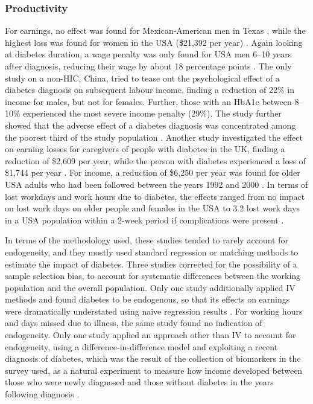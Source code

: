 \subsubsection{Productivity}
For earnings, no effect was found for Mexican-American men in Texas \parencite{Bastida2002}, while the highest loss was found for women in the USA (\$21,392 per year) \parencite{Minor2011}. Again looking at diabetes duration, a wage penalty was only found for USA men 6--10 years after diagnosis, reducing their wage by about 18 percentage points \parencite{Minor2013}. The only study on a non-\ac{HIC}, China, tried to tease out the psychological effect of a diabetes diagnosis on subsequent labour income, finding a reduction of 22\% in income for males, but not for females. Further, those with an \ac{HbA1c} between 8--10\% experienced the most severe income penalty (29\%). The study further showed that the adverse effect of a diabetes diagnosis was concentrated among the poorest third of the study population \parencite{Liu2014}. Another study investigated the effect on earning losses for caregivers of people with diabetes in the \ac{UK}, finding a reduction of \$2,609 per year, while the person with diabetes experienced a loss of \$1,744 per year \parencite{Holmes2003a}. For income, a reduction of \$6,250 per year was found for older USA adults who had been followed between the years 1992 and 2000 \parencite{Rivera2004}. In terms of lost workdays and work hours due to diabetes, the effects ranged from no impact on lost work days on older people \parencite{Rivera2004} and females in the USA \parencite{Minor2011} to 3.2 lost work days in a USA population within a 2-week period if complications were present \parencite{Ng2001b}.

In terms of the methodology used, these studies tended to rarely account for endogeneity, and they mostly used standard regression or matching methods to estimate the impact of diabetes. Three studies \parencite{Minor2011,Bastida2002,BrownIII2011} corrected for the possibility of a sample selection bias, to account for systematic differences between the working population and the overall population. Only one study additionally applied \ac{IV} methods and found diabetes to be endogenous, so that its effects on earnings were dramatically understated using naive regression results \parencite{Minor2011}. For working hours and days missed due to illness, the same study found no indication of endogeneity. Only one study applied an approach other than \ac{IV} to account for endogeneity, using a difference-in-difference model and exploiting a recent diagnosis of diabetes, which was the result of the collection of biomarkers in the survey used, as a natural experiment to measure how income developed between those who were newly diagnosed and those without diabetes in the years following diagnosis \parencite{Liu2014}.

